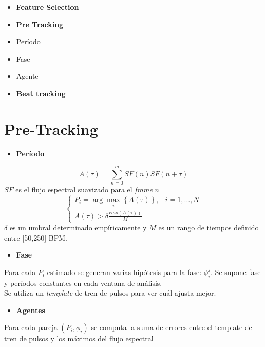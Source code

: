 \documentclass[12pt,a4paper,titlepage]{report}
\begin{document}
\vspace{20pt}
\begin{itemize}
	\item \textbf{Feature Selection}
	\item \textbf{Pre Tracking}\\
	  \item Período
	  \item Fase
	  \item Agente
	\item \textbf{Beat tracking}
\end{itemize}


\section{Pre-Tracking}

\vspace*{15pt}
\begin{scriptsize}
	\begin{itemize} \item \textbf{Período} \end{itemize}
	\begin{equation*}
		A(\tau) = \sum\limits_{n=0}^{m}SF(n)SF(n+\tau)
		\label{ec:autocorrelacion}
	\end{equation*}
	$SF$ es el flujo espectral suavizado para el \emph{frame} $n$
	\begin{equation*}
		\begin{cases}
		P_i = \arg\max_i \left\{ A(\tau) \right\}, & i=1,\dots, N\\
		A(\tau)>\delta \frac{rms(A(\tau))}{M} & 
		\end{cases}
		\label{ec:period}
	\end{equation*}
$\delta$ es un umbral determinado empíricamente y $M$ es un rango de tiempos definido entre [50,250] BPM.
\end{scriptsize}

\vspace*{15pt}
\begin{scriptsize}
\begin{itemize} \item \textbf{Fase} \end{itemize}
Para cada $P_i$ estimado se generan varias hipótesis para la fase: $\phi_i^j$. Se supone fase y períodos constantes en cada ventana de análisis.\\

Se utiliza un \emph{template} de tren de pulsos para ver cuál ajusta mejor.\\[.5cm]
\begin{itemize} \item \textbf{Agentes} \end{itemize}
Para cada pareja $(P_i,\phi_i)$ se computa la suma de errores entre el template de tren de pulsos y los máximos del flujo espectral

\end{scriptsize}
\end{document}
